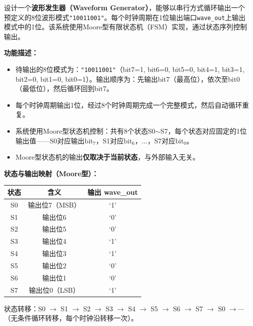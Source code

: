 设计一个\textbf{波形发生器（Waveform Generator）}，能够以串行方式循环输出一个预定义的8位波形模式\texttt{"10011001"}。每个时钟周期在1位输出端口\texttt{wave\_out}上输出模式中的1位。该系统使用Moore型有限状态机（FSM）实现，通过状态序列控制输出。

\vspace{0.3cm}

\textbf{功能描述：}
\begin{itemize}
  \item 待输出的8位模式为：\texttt{"10011001"}（bit7=1, bit6=0, bit5=0, bit4=1, bit3=1, bit2=0, bit1=0, bit0=1）。输出顺序为：先输出bit7（最高位），依次至bit0（最低位），然后循环回到bit7。
  \item 每个时钟周期输出1位，经过8个时钟周期完成一个完整模式，然后自动循环重复。
  \item 系统使用Moore型状态机控制：共有8个状态S0$\sim$S7，每个状态对应固定的1位输出值——S0对应输出$\text{bit}_7$，S1对应$\text{bit}_6$，$\ldots$，S7对应$\text{bit}_0$。
  \item Moore型状态机的输出\textbf{仅取决于当前状态}，与外部输入无关。
\end{itemize}

\vspace{0.3cm}

\textbf{状态与输出映射（Moore型）：}

\begin{center}
\begin{tabular}{|c|c|c|}
\hline
\textbf{状态} & \textbf{含义} & \textbf{输出 wave\_out} \\
\hline
S0 & 输出位7（MSB） & `1' \\
S1 & 输出位6 & `0' \\
S2 & 输出位5 & `0' \\
S3 & 输出位4 & `1' \\
S4 & 输出位3 & `1' \\
S5 & 输出位2 & `0' \\
S6 & 输出位1 & `0' \\
S7 & 输出位0（LSB） & `1' \\
\hline
\end{tabular}
\end{center}

状态转移：S0 $\to$ S1 $\to$ S2 $\to$ S3 $\to$ S4 $\to$ S5 $\to$ S6 $\to$ S7 $\to$ S0 $\to\cdots$（无条件循环转移，每个时钟沿转移一次）。

\vspace{0.3cm}

